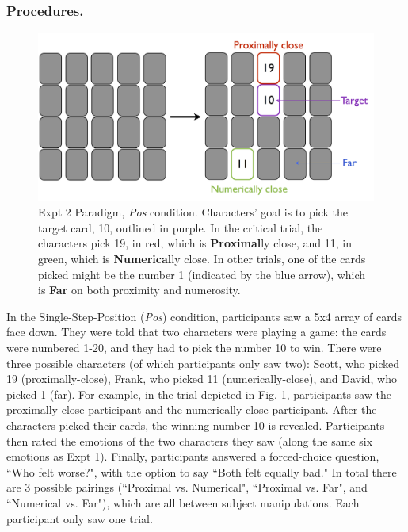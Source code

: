 \documentclass[10pt,letterpaper]{article}
\begin{document}
\subsubsection{Procedures.} 

\begin{figure}[htb!]
\includegraphics[width=\columnwidth]{images/card_paradigm.png}
\caption{ Expt 2 Paradigm, \textit{Pos} condition. Characters' goal is to pick the target card, 10, outlined in purple. In the critical trial, the characters pick 19, in red, which is \textbf{Proximal}ly close, and 11, in green, which is \textbf{Numerical}ly close. In other trials, one of the cards picked might be the number 1 (indicated by the blue arrow), which is \textbf{Far} on both proximity and numerosity. }
\label{Expt2ParadigmFig}
\end{figure}

In the Single-Step-Position (\textit{Pos}) condition, participants saw a 5x4 array of cards face down. They were told that two characters were playing a game: the cards were numbered 1-20, and they had to pick the number 10 to win. There were three possible characters (of which participants only saw two): Scott, who picked 19 (proximally-close), Frank, who picked 11 (numerically-close), and David, who picked 1 (far). For example, in the trial depicted in Fig. \ref{Expt2ParadigmFig}, participants saw the proximally-close participant and the numerically-close participant. After the characters picked their cards, the winning number 10 is revealed. Participants then rated the emotions of the two characters they saw (along the same six emotions as Expt 1). Finally, participants answered a forced-choice question, ``Who felt worse?", with the option to say ``Both felt equally bad." In total there are 3 possible pairings (``Proximal vs. Numerical", ``Proximal vs. Far", and ``Numerical vs. Far"), which are all between subject manipulations. Each participant only saw one trial.
\end{document}

